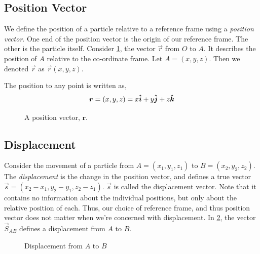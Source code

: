 \subsection{Position Vector}


We define the position of a particle relative to a reference frame using a \emph{position 
vector}. One end of the position vector is the origin of our reference frame. The other is 
the particle itself. Consider \cref{fig: position}, the 
vector \(\vec{r}\) from \(O\) to \(A\). It describes the position of \(A\) relative to the
co-ordinate frame. Let \(A = (x,y,z)\). Then we denoted \(\vec{r}\) as \(\vec{r}(x,y,z)\).

The position to any point is written as, \[
    \boldsymbol{r} = (x,y,z) = x{{\boldsymbol{\hat{i}}}} + y{{\boldsymbol{\hat{j}}}} + z{{\boldsymbol{\hat{k}}}}
\]

\begin{figure}
    [H]
    \centering
    \caption{A position vector, \(\mathbf{r}\).}
    \label{fig: position}
\end{figure}

\subsection{Displacement}


Consider the movement of a particle from \(A = (x_1,y_1,z_1)\) to \(B = (x_2,y_2,z_2)\). 
The \emph{displacement} is the change in the position vector,
and defines a true vector \(\vec{s} = (x_2-x_1,y_2-y_1,z_2-z_1)\).
\(\vec{s}\) is called the displacement vector. 
Note that it contains no information about the
individual positions, but only about the relative position of each. Thus, our choice
of reference frame, and thus position vector does not matter when we're concerned with displacement. 
In \cref{fig: displacement}, the vector
\(\vec{S}_{AB}\) defines a displacement from \(A\) to \(B\).

\begin{figure}
    [H]
    \centering
    \caption{Displacement from \(A\) to \(B\)}
    \label{fig: displacement}
\end{figure}

